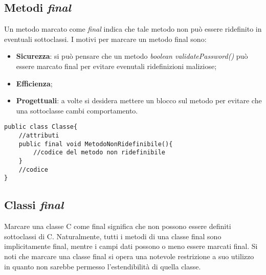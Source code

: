 \subsection{Metodi \textit{final}}
Un metodo marcato come \textit{final} indica che tale metodo non può essere ridefinito in eventuali sottoclassi.
I motivi per marcare un metodo final sono:
\begin{itemize}
	\item \textbf{Sicurezza}: si può pensare che un metodo \textit{boolean validatePassword()} può essere marcato final per evitare evenutali ridefinizioni maliziose;
	\item \textbf{Efficienza};
	\item \textbf{Progettuali}: a volte si desidera mettere un blocco sul metodo per evitare che una sottoclasse cambi comportamento.
\end{itemize}

\begin{lstlisting}
public class Classe{
    //attributi
    public final void MetodoNonRidefinibile(){
        //codice del metodo non ridefinibile
    }
    //codice
}
\end{lstlisting}

\subsection{Classi \textit{final}}
Marcare una classe C come final significa che non possono essere definiti sottoclassi di C. Naturalmente, tutti i metodi di una classe final sono implicitamente final, mentre i campi dati possono o meno essere marcati final.
Si noti che marcare una classe final si opera una notevole restrizione a suo utilizzo in quanto non sarebbe permesso l'estendibilità di quella classe.